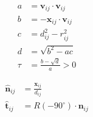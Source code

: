 \begin{align}
a &= \mathbf{v}_{ij} \cdot \mathbf{v}_{ij} \\
b &= -\mathbf{x}_{ij} \cdot \mathbf{v}_{ij} \\
c &= d_{ij}^{2} - r_{ij}^{2} \\
d &= \sqrt{b^{2} - a c} \\
\tau &= \frac{b - \sqrt{d}}{a} > 0
\end{align}

\begin{align}
\hat{\mathbf{n}}_{ij} &= \frac{\mathbf{x}_{ij}}{d_{ij}} \\
\hat{\mathbf{t}}_{ij} &= R(-90^{\circ}) \cdot \mathbf{n}_{ij}
\end{align}